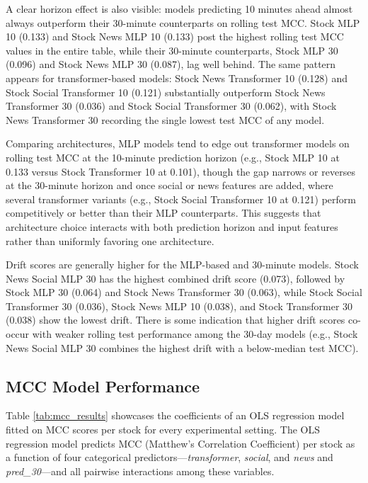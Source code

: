\documentclass[stu,floatsintext]{apa7}
\begin{document}
A clear horizon effect is also visible: models predicting 10 minutes ahead almost always outperform their 30-minute counterparts on rolling test MCC. Stock MLP 10 (0.133) and Stock News MLP 10 (0.133) post the highest rolling test MCC values in the entire table, while their 30-minute counterparts, Stock MLP 30 (0.096) and Stock News MLP 30 (0.087), lag well behind. The same pattern appears for transformer-based models: Stock News Transformer 10 (0.128) and Stock Social Transformer 10 (0.121) substantially outperform Stock News Transformer 30 (0.036) and Stock Social Transformer 30 (0.062), with Stock News Transformer 30 recording the single lowest test MCC of any model.

Comparing architectures, MLP models tend to edge out transformer models on rolling test MCC at the 10-minute prediction horizon (e.g., Stock MLP 10 at 0.133 versus Stock Transformer 10 at 0.101), though the gap narrows or reverses at the 30-minute horizon and once social or news features are added, where several transformer variants (e.g., Stock Social Transformer 10 at 0.121) perform competitively or better than their MLP counterparts. This suggests that architecture choice interacts with both prediction horizon and input features rather than uniformly favoring one architecture.

Drift scores are generally higher for the MLP-based and 30-minute models. Stock News Social MLP 30 has the highest combined drift score (0.073), followed by Stock MLP 30 (0.064) and Stock News Transformer 30 (0.063), while Stock Social Transformer 30 (0.036), Stock News MLP 10 (0.038), and Stock Transformer 30 (0.038) show the lowest drift. There is some indication that higher drift scores co-occur with weaker rolling test performance among the 30-day models (e.g., Stock News Social MLP 30 combines the highest drift with a below-median test MCC).

\subsection{MCC Model Performance}

Table \ref{tab:mcc_results} showcases the coefficients of an OLS regression model fitted on MCC scores per stock for every experimental setting. The OLS regression model predicts MCC (Matthew's Correlation Coefficient) per stock as a function of four categorical predictors---\textit{transformer}, \textit{social}, and \textit{news} and \textit{pred\_30}---and all pairwise interactions among these variables.
\medskip
\medskip
\end{document}
